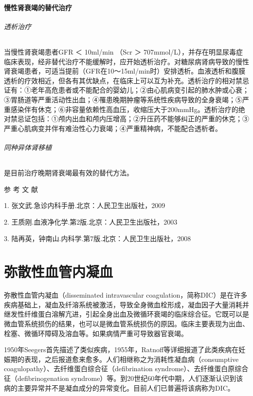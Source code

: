 \subsubsection{慢性肾衰竭的替代治疗}

\subparagraph{透析治疗}

当慢性肾衰竭患者GFR ＜ 10ml/min （Scr ＞
707mmol/L），并存在明显尿毒症临床表现，经非替代治疗不能缓解时，应开始透析治疗。对糖尿病肾病导致的慢性肾衰竭患者，可适当提前（GFR在10～15ml/min时）安排透析。血液透析和腹膜透析的疗效相近，但各有其优缺点，在临床上可以互为补充。透析治疗的相对禁忌证有：①老年高危患者或不能配合的婴幼儿；②由心肌病变引起的肺水肿或心衰；③胃肠道等严重活动性出血；④罹患晚期肿瘤等系统性疾病导致的全身衰竭；⑤严重感染伴有休克；⑥非容量依赖性高血压，收缩压大于200mmHg。透析治疗的绝对禁忌证包括：①颅内出血和颅内压增高；②升压药不能够纠正的严重的休克；③严重心肌病变并伴有难治性心力衰竭；④严重精神病，不能配合透析者。

\subparagraph{同种异体肾移植}

是目前治疗晚期肾衰竭最有效的替代方法。

\protect\hypertarget{text00086.html}{}{}

\hypertarget{text00086.htmlux5cux23CHP3-8-8}{}
参 考 文 献

1. 张文武.急诊内科手册.北京：人民卫生出版社，2009

2. 王质刚.血液净化学.第2版.北京：人民卫生出版社，2003

3. 陆再英，钟南山.内科学.第7版.北京：人民卫生出版社，2008

\protect\hypertarget{text00087.html}{}{}

\chapter{弥散性血管内凝血}

弥散性血管内凝血（disseminated intravascular
coagulation，简称DIC）是在许多疾病基础上，凝血及纤溶系统被激活，导致全身微血栓形成，凝血因子大量消耗并继发性纤维蛋白溶解亢进，引起全身出血及微循环衰竭的临床综合征。它既可以是微血管系统损伤的结果，也可以是微血管系统损伤的原因。临床主要表现为出血、栓塞、微循环障碍及溶血等。如果病情严重可导致器官衰竭。

1950年Seegers首先描述了类似疾病，1955年，Ratnoff等详细报道了此类疾病在妊娠期的表现，之后报道愈来愈多。人们相继称之为消耗性凝血病（consumptive
coagulopathy）、去纤维蛋白综合征（defibrination
syndrome）、去纤维蛋白原综合征（defibrinogenation
syndrome）等。到20世纪60年代中期，人们逐渐认识到该病的主要异常并不是凝血成分的异常变化。目前人们已普遍将该病称为DIC。

